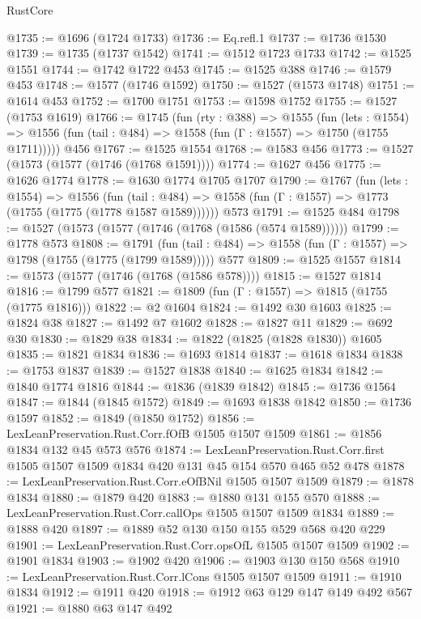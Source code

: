 \begin{lexlean}{RustCore}
\begin{coremodule}
@1735 := @1696 (@1724 @1733)
@1736 := Eq.refl.{1}
@1737 := @1736 @1530
@1739 := @1735 (@1737 @1542)
@1741 := @1512 @1723 @1733
@1742 := @1525 @1551
@1744 := @1742 @1722 @453
@1745 := @1525 @388
@1746 := @1579 @453
@1748 := @1577 (@1746 @1592)
@1750 := @1527 (@1573 @1748)
@1751 := @1614 @453
@1752 := @1700 @1751
@1753 := @1598 @1752
@1755 := @1527 (@1753 @1619)
@1766 := @1745
    (fun (rty : @388) =>
    @1555
      (fun (lets : @1554) =>
      @1556 (fun (tail : @484) => @1558 (fun (Γ : @1557) => @1750 (@1755 @1711)))))
    @456
@1767 := @1525 @1554
@1768 := @1583 @456
@1773 := @1527 (@1573 (@1577 (@1746 (@1768 @1591))))
@1774 := @1627 @456
@1775 := @1626 @1774
@1778 := @1630 @1774 @1705 @1707
@1790 := @1767
    (fun (lets : @1554) =>
    @1556
      (fun (tail : @484) => @1558 (fun (Γ : @1557) => @1773 (@1755 (@1775 (@1778 @1587 @1589))))))
    @573
@1791 := @1525 @484
@1798 := @1527 (@1573 (@1577 (@1746 (@1768 (@1586 (@574 @1589))))))
@1799 := @1778 @573
@1808 := @1791
    (fun (tail : @484) => @1558 (fun (Γ : @1557) => @1798 (@1755 (@1775 (@1799 @1589)))))
    @577
@1809 := @1525 @1557
@1814 := @1573 (@1577 (@1746 (@1768 (@1586 @578))))
@1815 := @1527 @1814
@1816 := @1799 @577
@1821 := @1809 (fun (Γ : @1557) => @1815 (@1755 (@1775 @1816)))
@1822 := @2 @1604
@1824 := @1492 @30 @1603
@1825 := @1824 @38
@1827 := @1492 @7 @1602
@1828 := @1827 @11
@1829 := @692 @30
@1830 := @1829 @38
@1834 := @1822 (@1825 (@1828 @1830)) @1605
@1835 := @1821 @1834
@1836 := @1693 @1814
@1837 := @1618 @1834
@1838 := @1753 @1837
@1839 := @1527 @1838
@1840 := @1625 @1834
@1842 := @1840 @1774 @1816
@1844 := @1836 (@1839 @1842)
@1845 := @1736 @1564
@1847 := @1844 (@1845 @1572)
@1849 := @1693 @1838 @1842
@1850 := @1736 @1597
@1852 := @1849 (@1850 @1752)
@1856 := LexLeanPreservation.Rust.Corr.fOfB @1505 @1507 @1509
@1861 := @1856 @1834 @132 @45 @573 @576
@1874 := LexLeanPreservation.Rust.Corr.first
    @1505
    @1507
    @1509
    @1834
    @420
    @131
    @45
    @154
    @570
    @465
    @52
    @478
@1878 := LexLeanPreservation.Rust.Corr.eOfBNil @1505 @1507 @1509
@1879 := @1878 @1834
@1880 := @1879 @420
@1883 := @1880 @131 @155 @570
@1888 := LexLeanPreservation.Rust.Corr.callOps @1505 @1507 @1509 @1834
@1889 := @1888 @420
@1897 := @1889 @52 @130 @150 @155 @529 @568 @420 @229
@1901 := LexLeanPreservation.Rust.Corr.opsOfL @1505 @1507 @1509
@1902 := @1901 @1834
@1903 := @1902 @420
@1906 := @1903 @130 @150 @568
@1910 := LexLeanPreservation.Rust.Corr.lCons @1505 @1507 @1509
@1911 := @1910 @1834
@1912 := @1911 @420
@1918 := @1912 @63 @129 @147 @149 @492 @567
@1921 := @1880 @63 @147 @492

\end{coremodule}
\end{lexlean}
